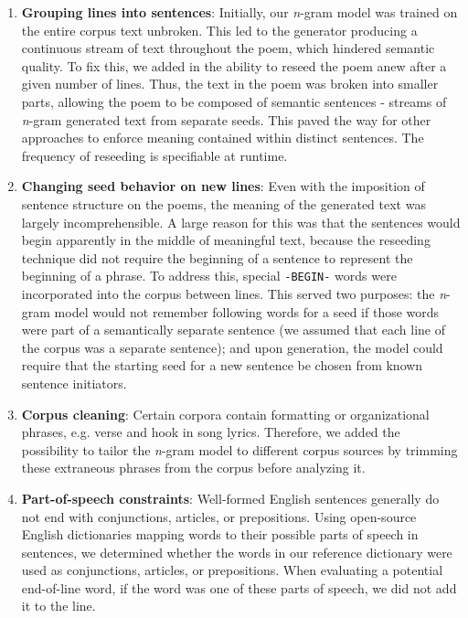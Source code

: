 \documentclass[10pt,twocolumn]{article}
\begin{document}
\begin{enumerate}
\item \textbf{Grouping lines into sentences}: Initially, our \emph{n}-gram model was trained on the entire corpus text unbroken. This led to the generator producing a continuous stream of text throughout the poem, which hindered semantic quality. To fix this, we added in the ability to reseed the poem anew after a given number of lines. Thus, the text in the poem was broken into smaller parts, allowing the poem to be composed of semantic sentences - streams of \emph{n}-gram generated text from separate seeds. This paved the way for other approaches to enforce meaning contained within distinct sentences. The frequency of reseeding is specifiable at runtime. 

\item \textbf{Changing seed behavior on new lines}: Even with the imposition of sentence structure on the poems, the meaning of the generated text was largely incomprehensible. A large reason for this was that the sentences would begin apparently in the middle of meaningful text, because the reseeding technique did not require the beginning of a sentence to represent the beginning of a phrase. To address this, special \verb!-BEGIN-! words were incorporated into the corpus between lines. This served two purposes: the \emph{n}-gram model would not remember following words for a seed if those words were part of a semantically separate sentence (we assumed that each line of the corpus was a separate sentence); and upon generation, the model could require that the starting seed for a new sentence be chosen from known sentence initiators.

\item \textbf{Corpus cleaning}: Certain corpora contain formatting or organizational phrases, e.g. verse and hook in song lyrics. Therefore, we added the possibility to tailor the \emph{n}-gram model to different corpus sources by trimming these extraneous phrases from the corpus before analyzing it.

\item \textbf{Part-of-speech constraints}: Well-formed English sentences generally do not end with conjunctions, articles, or prepositions. Using open-source English dictionaries mapping words to their possible parts of speech in sentences, we determined whether the words in our reference dictionary were used as conjunctions, articles, or prepositions.\cite{Moby} When evaluating a potential end-of-line word, if the word was one of these parts of speech,  we did not add it to the line.
\end{enumerate}
\end{document}
